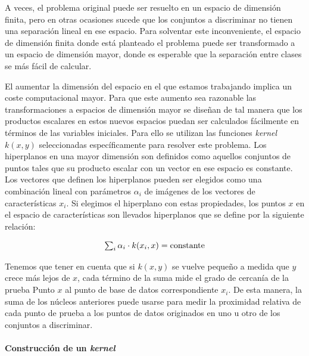 \documentclass[12pt,spanish,a4paper]{article}
\let\oldparagraph\paragraph
\renewcommand{\paragraph}[1]{\oldparagraph{#1}\mbox{}}
\numberwithin{equation}{section}
\begin{document}
A veces, el problema original puede ser resuelto en un espacio de
dimensión finita, pero en otras ocasiones sucede que los conjuntos a
discriminar no tienen una separación lineal en ese espacio. Para
solventar este inconveniente, el espacio de dimensión finita donde está
planteado el problema puede ser transformado a un espacio de dimensión
mayor, donde es esperable que la separación entre clases se más fácil de
calcular.

El aumentar la dimensión del espacio en el que estamos trabajando
implica un coste computacional mayor. Para que este aumento sea
razonable las transformaciones a espacios de dimensión mayor se diseñan
de tal manera que los productos escalares en estos nuevos espacios
puedan ser calculados fácilmente en términos de las variables iniciales.
Para ello se utilizan las funciones \emph{kernel}
\({\displaystyle k(x,y)}\) seleccionadas específicamente para resolver
este problema. Los hiperplanos en una mayor dimensión son definidos como
aquellos conjuntos de puntos tales que su producto escalar con un vector
en ese espacio es constante. Los vectores que definen los hiperplanos
pueden ser elegidos como una combinación lineal con parámetros
\({\displaystyle \alpha_{i}}\) de imágenes de los vectores de
características \({\displaystyle x_{i}}\). Si elegimos el hiperplano con
estas propiedades, los puntos \({\displaystyle x}\) en el espacio de
características son llevados hiperplanos que se define por la siguiente
relación:

\begin{equation}
{\displaystyle \textstyle \sum_{i}\alpha_{i}\cdot k(x_{i},x) = \mathrm {constante}}
\end{equation}

Tenemos que tener en cuenta que si \({\displaystyle k(x,y)}\) se vuelve
pequeño a medida que \({\displaystyle y}\) crece más lejos de
\({\displaystyle x}\), cada término de la suma mide el grado de cercanía
de la prueba Punto \({\displaystyle x}\) al punto de base de datos
correspondiente \({\displaystyle x_ {i}}\). De esta manera, la suma de
los núcleos anteriores puede usarse para medir la proximidad relativa de
cada punto de prueba a los puntos de datos originados en uno u otro de
los conjuntos a discriminar.

\hypertarget{construccion-de-un-kernel}{%
\paragraph{\texorpdfstring{Construcción de un
\emph{kernel}}{Construcción de un kernel}}\label{construccion-de-un-kernel}}
\end{document}
